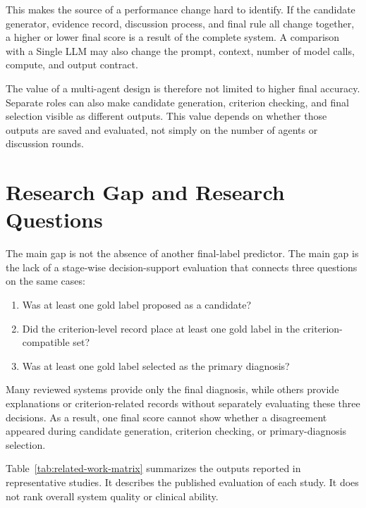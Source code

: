 This makes the source of a performance change hard to identify. If the candidate generator, evidence record, discussion process, and final rule all change together, a higher or lower final score is a result of the complete system. A comparison with a Single LLM may also change the prompt, context, number of model calls, compute, and output contract.

The value of a multi-agent design is therefore not limited to higher final accuracy. Separate roles can also make candidate generation, criterion checking, and final selection visible as different outputs. This value depends on whether those outputs are saved and evaluated, not simply on the number of agents or discussion rounds.

\section{Research Gap and Research Questions}

The main gap is not the absence of another final-label predictor. The main gap is the lack of a stage-wise decision-support evaluation that connects three questions on the same cases:

\begin{enumerate}
    \item Was at least one gold label proposed as a candidate?
    \item Did the criterion-level record place at least one gold label in the criterion-compatible set?
    \item Was at least one gold label selected as the primary diagnosis?
\end{enumerate}

Many reviewed systems provide only the final diagnosis, while others provide explanations or criterion-related records without separately evaluating these three decisions. As a result, one final score cannot show whether a disagreement appeared during candidate generation, criterion checking, or primary-diagnosis selection.

Table~\ref{tab:related-work-matrix} summarizes the outputs reported in representative studies. It describes the published evaluation of each study. It does not rank overall system quality or clinical ability.

